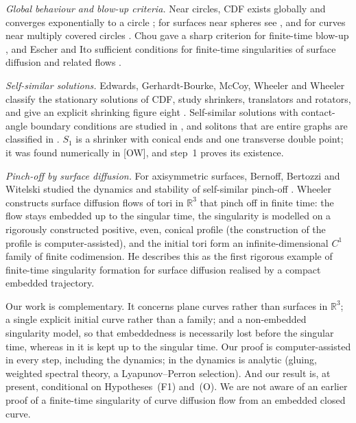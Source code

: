 \documentclass[11pt]{amsart}
\theoremstyle{definition}
\theoremstyle{remark}
\newcommand{\R}{\mathbb{R}}
\newcommand{\dref}[1]{[\textsf{#1}]}
\begin{document}
\emph{Global behaviour and blow-up criteria.} Near circles, CDF exists globally \cite{ElliottGarcke1997} and converges exponentially to a circle \cite{Wheeler2013}; for surfaces near spheres see \cite{EscherMayerSimonett1998,Wheeler2012}, and for curves near multiply covered circles \cite{MiuraOkabe2021}. Chou gave a sharp criterion for finite-time blow-up \cite{Chou2003}, and Escher and Ito sufficient conditions for finite-time singularities of surface diffusion and related flows \cite{EscherIto2005}.

\emph{Self-similar solutions.} Edwards, Gerhardt-Bourke, McCoy, Wheeler and Wheeler classify the stationary solutions of CDF, study shrinkers, translators and rotators, and give an explicit shrinking figure eight \cite{EGMWW2015}. Self-similar solutions with contact-angle boundary conditions are studied in \cite{AsaiGiga2014}, and solitons that are entire graphs are classified in \cite{RybkaWheeler2024}. $S_1$ is a shrinker with conical ends and one transverse double point; it was found numerically in \dref{OW}, and step~1 proves its existence.

\emph{Pinch-off by surface diffusion.} For axisymmetric surfaces, Bernoff, Bertozzi and Witelski studied the dynamics and stability of self-similar pinch-off \cite{BernoffBertozziWitelski1998}. Wheeler \cite{Wheeler2026} constructs surface diffusion flows of tori in $\R^3$ that pinch off in finite time: the flow stays embedded up to the singular time, the singularity is modelled on a rigorously constructed positive, even, conical profile (the construction of the profile is computer-assisted), and the initial tori form an infinite-dimensional $C^1$ family of finite codimension. He describes this as the first rigorous example of finite-time singularity formation for surface diffusion realised by a compact embedded trajectory.

Our work is complementary. It concerns plane curves rather than surfaces in $\R^3$; a single explicit initial curve rather than a family; and a non-embedded singularity model, so that embeddedness is necessarily lost before the singular time, whereas in \cite{Wheeler2026} it is kept up to the singular time. Our proof is computer-assisted in every step, including the dynamics; in \cite{Wheeler2026} the dynamics is analytic (gluing, weighted spectral theory, a Lyapunov--Perron selection). And our result is, at present, conditional on Hypotheses~(F1) and~(O). We are not aware of an earlier proof of a finite-time singularity of curve diffusion flow from an embedded closed curve.
\end{document}
